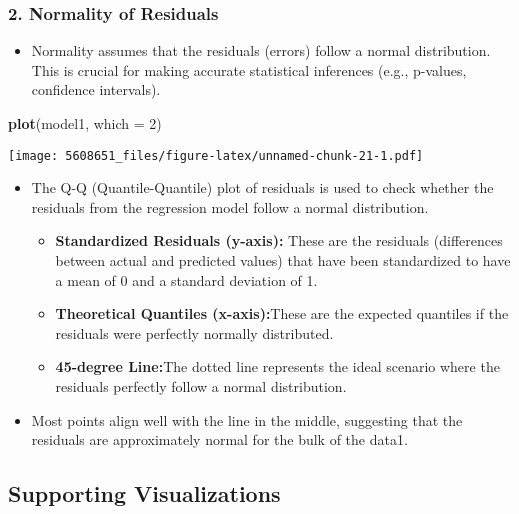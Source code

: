 \documentclass[
]{article}
\newenvironment{Shaded}{\begin{snugshade}}{\end{snugshade}}
\newcommand{\AttributeTok}[1]{\textcolor[rgb]{0.13,0.29,0.53}{#1}}
\newcommand{\DecValTok}[1]{\textcolor[rgb]{0.00,0.00,0.81}{#1}}
\newcommand{\FunctionTok}[1]{\textcolor[rgb]{0.13,0.29,0.53}{\textbf{#1}}}
\newcommand{\NormalTok}[1]{#1}
\providecommand{\tightlist}{%
  \setlength{\itemsep}{0pt}\setlength{\parskip}{0pt}}
\begin{document}
\subsubsection{2. Normality of Residuals}\label{normality-of-residuals}

\begin{itemize}
\tightlist
\item
  Normality assumes that the residuals (errors) follow a normal
  distribution. This is crucial for making accurate statistical
  inferences (e.g., p-values, confidence intervals).
\end{itemize}

\begin{Shaded}
\begin{Highlighting}[]
\FunctionTok{plot}\NormalTok{(model1, }\AttributeTok{which =} \DecValTok{2}\NormalTok{)}
\end{Highlighting}
\end{Shaded}

\texttt{[image: 5608651\_files/figure-latex/unnamed-chunk-21-1.pdf]}

\begin{itemize}
\tightlist
\item
  The Q-Q (Quantile-Quantile) plot of residuals is used to check whether
  the residuals from the regression model follow a normal distribution.

  \begin{itemize}
  \tightlist
  \item
    \textbf{Standardized Residuals (y-axis):} These are the residuals
    (differences between actual and predicted values) that have been
    standardized to have a mean of 0 and a standard deviation of 1.
  \item
    \textbf{Theoretical Quantiles (x-axis):}These are the expected
    quantiles if the residuals were perfectly normally distributed.
  \item
    \textbf{45-degree Line:}The dotted line represents the ideal
    scenario where the residuals perfectly follow a normal distribution.
  \end{itemize}
\item
  Most points align well with the line in the middle, suggesting that
  the residuals are approximately normal for the bulk of the data1.
\end{itemize}

\subsection{Supporting Visualizations}\label{supporting-visualizations}
\end{document}
